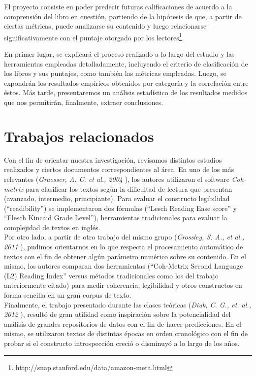 \documentclass[12pt,journal,compsoc]{IEEEtran}
\begin{document}
El proyecto consiste en poder predecir futuras calificaciones de acuerdo a la comprensión del libro en cuestión, partiendo de la hipótesis de que, a partir de ciertas métricas, puede analizarse su contenido y luego relacionarse significativamente con el puntaje otorgado por los lectores\footnote{http://snap.stanford.edu/data/amazon-meta.html}.

En primer lugar, se explicará el proceso realizado a lo largo del estudio y las herramientas empleadas detalladamente, incluyendo el criterio de clasificación de los libros y sus puntajes, como también las métricas empleadas. Luego, se expondrán los resultados empíricos obtenidos por categoría y la correlación entre éstos. Más tarde, presentaremos un análisis estadístico de los resultados medidos que nos permitirán, finalmente, extraer conclusiones.

\section{Trabajos relacionados}
Con el fin de orientar nuestra investigación, revisamos distintos estudios realizados y ciertos documentos correspondientes al área. En uno de los más relevantes (\textit{Graesser, A. C. et al., 2004} \cite{graesser}), los autores utilizaron el software \textit{Coh-metrix} para clasificar los textos según la dificultad de lectura que presentan (avanzado, intermedio, principiante). Para evaluar el constructo legibilidad (``readibility'') se implementaron dos fórmulas (``Lesch Reading Ease score'' y ``Flesch Kincaid Grade Level''), herramientas tradicionales para evaluar la complejidad de textos en inglés.\\
Por otro lado, a partir de otro trabajo del mismo grupo (\textit{Crossley, S. A., et al., 2011} \cite{crossley}), pudimos orientarnos en lo que respecta el procesamiento automático de textos con el fin de obtener algún parámetro numérico sobre su contenido. En el mismo, los autores comparan dos herramientas (``Coh-Metrix Second Language (L2) Reading Index'' versus métodos tradicionales como los del trabajo anteriormente citado) para medir coherencia, legibilidad y otros constructos en forma sencilla en un gran corpus de texto.\\
Finalmente, el trabajo presentado durante las clases teóricas (\textit{Diuk, C. G., et. al., 2012} \cite{diuk}), resultó de gran utilidad como inspiración sobre la potencialidad del análisis de grandes repositorios de datos con el fin de hacer predicciones. En el mismo, se utilizaron  textos de distintas épocas en orden cronológico con el fin de probar si el constructo introspección creció o disminuyó a lo largo de los años.
\end{document}
